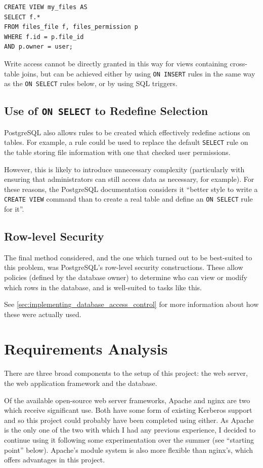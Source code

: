 \documentclass[12pt]{report}
\begin{document}
\begin{verbatim}
CREATE VIEW my_files AS
SELECT f.*
FROM files_file f, files_permission p
WHERE f.id = p.file_id
AND p.owner = user;
\end{verbatim}

Write access cannot be directly granted in this way for views containing cross-table joins, but can be achieved either by using \texttt{ON INSERT} rules in the same way as the \texttt{ON SELECT} rules below, or by using SQL triggers\cite{postgres-CREATE_VIEW}.

\subsection{Use of \texttt{ON SELECT} to Redefine Selection}
PostgreSQL also allows rules to be created which effectively redefine actions on tables. For example, a rule could be used to replace the default \texttt{SELECT} rule on the table storing file information with one that checked user permissions.

However, this is likely to introduce unnecessary complexity (particularly with ensuring that administrators can still access data as necessary, for example). For these reasons, the PostgreSQL documentation considers it ``better style to write a \texttt{CREATE VIEW} command than to create a real table and define an \texttt{ON SELECT} rule for it''\cite{postgres-CREATE_RULE}.

\subsection{Row-level Security}
The final method considered, and the one which turned out to be best-suited to this problem, was PostgreSQL's row-level security constructions. These allow policies (defined by the database owner) to determine who can view or modify which rows in the database, and is well-suited to tasks like this.

See \autoref{sec:implementing_database_access_control} for more information about how these were actually used.

\section{Requirements Analysis}
There are three broad components to the setup of this project: the web server, the web application framework and the database.

Of the available open-source web server frameworks, Apache and nginx are two which receive significant use. Both have some form of existing Kerberos support and so this project could probably have been completed using either. As Apache is the only one of the two with which I had any previous experience, I decided to continue using it following some experimentation over the summer (see ``starting point'' below). Apache's module system is also more flexible than nginx's, which offers advantages in this project.
\end{document}
